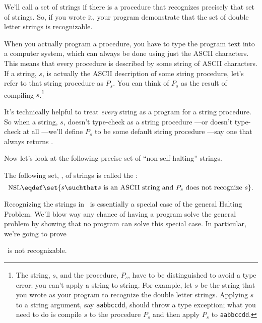 We'll call a set of strings  if there is a procedure
that recognizes precisely that set of strings.  So, if you wrote it, your
program demonstrate that the set of double letter strings is recognizable.

When you actually program a procedure, you have to type the program text
into a computer system, which can always be done using just the ASCII
characters.  This means that every procedure is described by some string
of ASCII characters.  If a string, $s$, is actually the ASCII description
of some string procedure, let's refer to that string procedure as $P_s$.
You can think of $P_s$ as the result of compiling $s$.\footnote{The
  string, $s$, and the procedure, $P_s$, have to be distinguished to avoid
  a type error: you can't apply a string to string.  For example, let $s$
  be the string that you wrote as your program to recognize the double
  letter strings.  Applying $s$ to a string argument, say
  \texttt{aabbccdd}, should throw a type exception; what you need to do is
  compile $s$ to the procedure $P_s$ and then apply $P_s$ to
  \texttt{aabbccdd}.  \iffalse This should result in a returned value
  \True, since \texttt{aabbccdd} is a double letter string.\fi }

It's technically helpful to treat \emph{every} string as a program for
a string procedure.  So when a string, $s$, doesn't type-check as a
string procedure ---or doesn't type-check at all ---we'll define $P_s$
to be some default string procedure ---say one that always returns
\False.  \iffalse So $s$ is an ill-formed string, $P_S$ will be a
recognizer for the empty set of strings.  \fi

Now let's look at the following precise set of ``non-self-halting'' strings.

\begin{definition}\label{notselfhalt_def}
The following set, \nsl, of strings is called the :
\begin{equation}\label{notselfhalt_eqdef}
\nsl \eqdef \set{s \suchthat s
         \text{ is an ASCII string and } P_s
         \text{ does not recognize } s}.
\end{equation}
\end{definition}
Recognizing the strings in \nsl\ is essentially a special case of the
general Halting Problem.  We'll blow way any chance of having a program
solve the general problem by showing that no program can solve this
special case.  In particular, we're going to prove
\begin{theorem}\label{nsl_thm}
\nsl\ is not recognizable.
\end{theorem}

